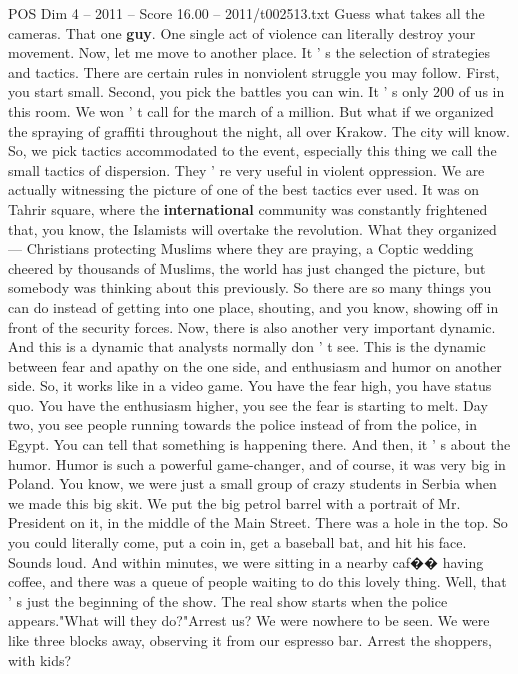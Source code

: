 \begin{textsample}{POS Dim 4 – 2011 – Score 16.00 – 2011/t002513.txt}
Guess what takes all the cameras.
That one \textbf{guy}.
One single act of violence can literally destroy your movement.
Now, let me move to another place.
It ' s the selection of strategies and tactics.
There are certain rules in nonviolent struggle you may follow.
First, you start small.
Second, you pick the battles you can win.
It ' s only 200 of us in this room.
We won ' t call for the march of a million.
But what if we organized the spraying of graffiti throughout the night, all over Krakow.
The city will know.
So, we pick tactics accommodated to the event, especially this thing we call the small tactics of dispersion.
They ' re very useful in violent oppression.
We are actually witnessing the picture of one of the best tactics ever used.
It was on Tahrir square, where the \textbf{international} community was constantly frightened that, you know, the Islamists will overtake the revolution.
What they organized — Christians protecting Muslims where they are praying, a Coptic wedding cheered by thousands of Muslims, the world has just changed the picture, but somebody was thinking about this previously.
So there are so many things you can do instead of getting into one place, shouting, and you know, showing off in front of the security forces.
Now, there is also another very important dynamic.
And this is a dynamic that analysts normally don ' t see.
This is the dynamic between fear and apathy on the one side, and enthusiasm and humor on another side.
So, it works like in a video game.
You have the fear high, you have status quo.
You have the enthusiasm higher, you see the fear is starting to melt.
Day two, you see people running towards the police instead of from the police, in Egypt.
You can tell that something is happening there.
And then, it ' s about the humor.
Humor is such a powerful game-changer, and of course, it was very big in Poland.
You know, we were just a small group of crazy students in Serbia when we made this big skit.
We put the big petrol barrel with a portrait of Mr.
President on it, in the middle of the Main Street.
There was a hole in the top.
So you could literally come, put a coin in, get a baseball bat, and hit his face.
Sounds loud.
And within minutes, we were sitting in a nearby caf{\EmojiFont �}{\EmojiFont �} having coffee, and there was a queue of people waiting to do this lovely thing.
Well, that ' s just the beginning of the show.
The real show starts when the police appears."What will they do?"Arrest us?
We were nowhere to be seen.
We were like three blocks away, observing it from our espresso bar.
Arrest the shoppers, with kids?

\end{textsample}
